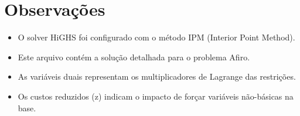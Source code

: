 \documentclass[12pt]{article}
\begin{document}
\section{Observações}

\begin{itemize}
\item O solver HiGHS foi configurado com o método IPM (Interior Point Method).
\item Este arquivo contém a solução detalhada para o problema Afiro.
\item As variáveis duais representam os multiplicadores de Lagrange das restrições.
\item Os custos reduzidos (z) indicam o impacto de forçar variáveis não-básicas na base.
\end{itemize}
\end{document}
